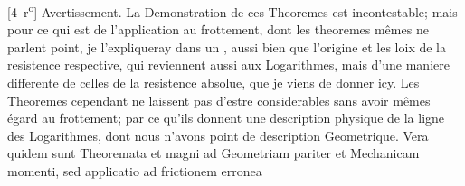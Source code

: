 [4~r\textsuperscript{o}]
\pend
\count{}
%
%
\vspace{1em}
\pstart
\centering
Avertissement.
\pend
\pstart
\noindent
La Demonstration de ces Theoremes est incontestable;
mais pour ce qui est de l'application au
frottement\protect{},
dont les theoremes m\^{e}mes ne parlent point,
je l'expliqueray
\pend
\newpage
\pstart\noindent
dans un ,
aussi bien que l'origine et les loix de la
resistence respective\protect{}, qui reviennent aussi aux Logarithmes,
mais d'une maniere differente de celles de la
resistence absolue\protect{},
que je viens de donner icy.
Les Theoremes cependant ne laissent pas d'estre considerables sans avoir m\^{e}mes \'{e}gard au frottement;
par ce qu'ils donnent une description physique de la ligne des Logarithmes, dont nous n'avons point
de description Geometrique.
\pend
\vspace{1em} 
\count{}
\count{}
\pstart
{}
\pend
\pstart
\noindent
Vera quidem sunt
Theoremata et magni ad Geometriam pariter et Mechanicam momenti,
sed applicatio ad
frictionem\protect{}
erronea
